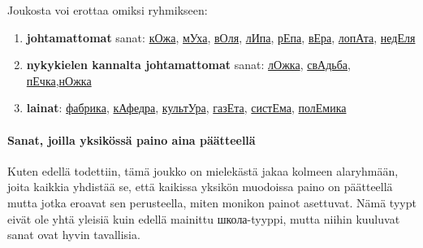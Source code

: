 \documentclass[]{scrartcl}
\providecommand{\tightlist}{%
  \setlength{\itemsep}{0pt}\setlength{\parskip}{0pt}}
\begin{document}
Joukosta voi erottaa omiksi ryhmikseen:

\begin{enumerate}
\def\labelenumi{\arabic{enumi}.}
\tightlist
\item
  \textbf{johtamattomat} sanat:
  \href{http://ru.wiktionary.org/wiki/\%D0\%BA\%D0\%BE\%D0\%B6\%D0\%B0}{кОжа},
  \href{http://ru.wiktionary.org/wiki/\%D0\%BC\%D1\%83\%D1\%85\%D0\%B0}{мУха},
  \href{http://ru.wiktionary.org/wiki/\%D0\%B2\%D0\%BE\%D0\%BB\%D1\%8F}{вОля},
  \href{http://ru.wiktionary.org/wiki/\%D0\%BB\%D0\%B8\%D0\%BF\%D0\%B0}{лИпа},
  \href{http://ru.wiktionary.org/wiki/\%D1\%80\%D0\%B5\%D0\%BF\%D0\%B0}{рЕпа},
  \href{http://ru.wiktionary.org/wiki/\%D0\%B2\%D0\%B5\%D1\%80\%D0\%B0}{вЕра},
  \href{http://ru.wiktionary.org/wiki/\%D0\%BB\%D0\%BE\%D0\%BF\%D0\%B0\%D1\%82\%D0\%B0}{лопАта},
  \href{http://ru.wiktionary.org/wiki/\%D0\%BD\%D0\%B5\%D0\%B4\%D0\%B5\%D0\%BB\%D1\%8F}{недЕля}
\item
  \textbf{nykykielen kannalta johtamattomat} sanat:
  \href{http://ru.wiktionary.org/wiki/\%D0\%BB\%D0\%BE\%D0\%B6\%D0\%BA\%D0\%B0}{лОжка},
  \href{http://ru.wiktionary.org/wiki/\%D1\%81\%D0\%B2\%D0\%B0\%D0\%B4\%D1\%8C\%D0\%B1\%D0\%B0}{свАдьба},
  \href{http://ru.wiktionary.org/wiki/\%D0\%BF\%D0\%B5\%D1\%87\%D0\%BA\%D0\%B0}{пЕчка},\href{http://ru.wiktionary.org/wiki/\%D0\%BD\%D0\%BE\%D0\%B6\%D0\%BA\%D0\%B0}{нОжка}
\item
  \textbf{lainat}:
  \href{http://ru.wiktionary.org/wiki/\%D1\%84\%D0\%B0\%D0\%B1\%D1\%80\%D0\%B8\%D0\%BA\%D0\%B0}{фабрика},
  \href{http://ru.wiktionary.org/wiki/\%D0\%BA\%D0\%B0\%D1\%84\%D0\%B5\%D0\%B4\%D1\%80\%D0\%B0}{кАфедра},
  \href{http://ru.wiktionary.org/wiki/\%D0\%BA\%D1\%83\%D0\%BB\%D1\%8C\%D1\%82\%D1\%83\%D1\%80\%D0\%B0}{культУра},
  \href{http://ru.wiktionary.org/wiki/\%D0\%B3\%D0\%B0\%D0\%B7\%D0\%B5\%D1\%82\%D0\%B0}{газЕта},
  \href{http://ru.wiktionary.org/wiki/\%D1\%81\%D0\%B8\%D1\%81\%D1\%82\%D0\%B5\%D0\%BC\%D0\%B0}{систЕма},
  \href{http://ru.wiktionary.org/wiki/\%D0\%BF\%D0\%BE\%D0\%BB\%D0\%B5\%D0\%BC\%D0\%B8\%D0\%BA\%D0\%B0}{полЕмика}
\end{enumerate}

\paragraph{Sanat, joilla yksikössä paino aina
päätteellä}\label{sanat-joilla-yksikuxf6ssuxe4-paino-aina-puxe4uxe4tteelluxe4}

Kuten edellä todettiin, tämä joukko on mielekästä jakaa kolmeen
alaryhmään, joita kaikkia yhdistää se, että kaikissa yksikön muodoissa
paino on päätteellä mutta jotka eroavat sen perusteella, miten monikon
painot asettuvat. Nämä tyypt eivät ole yhtä yleisiä kuin edellä mainittu
школа-tyyppi, mutta niihin kuuluvat sanat ovat hyvin tavallisia.
\end{document}
